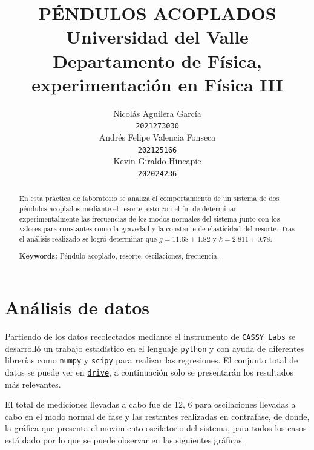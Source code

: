 \documentclass[10pt]{article}
\title{
    PÉNDULOS ACOPLADOS\\
    Universidad del Valle \\
    Departamento de Física, experimentación en Física III
}
\author{
    Nicolás Aguilera García \\
    {\tt 2021273030} \\
    \And
    Andrés Felipe Valencia Fonseca \\
    {\tt 202125166} \\
    \And
    Kevin Giraldo Hincapie\\
    {\tt 202024236} \\
}
\date{}
\begin{document}
    \maketitle

    \begin{abstract}
        En esta práctica de laboratorio se analiza el comportamiento de un sistema de dos péndulos acoplados mediante el resorte, esto con el fin de determinar experimentalmente las frecuencias de los modos normales del sistema junto con los valores para constantes como la gravedad y la constante de elasticidad del resorte. Tras el análisis realizado se logró determinar que $g = 11.68 \pm 1.82$ y $k = 2.811 \pm 0.78$.

            {\bf Keywords: } Péndulo acoplado, resorte, oscilaciones, frecuencia.
    \end{abstract}

    \section{Análisis de datos}
        Partiendo de los datos recolectados mediante el instrumento de \texttt{CASSY Labs} se desarrolló un trabajo estadístico en el lenguaje \texttt{python} y con ayuda de diferentes librerías como \texttt{numpy} y \texttt{scipy} para realizar las regresiones. El conjunto total de datos se puede ver en \href{https://drive.google.com/drive/folders/1HW9HpYB_uKflT2-5fgyOxWJDfALd5ZZW?usp=share_link}{\texttt{drive}}, a continuación solo se presentarán los resultados más relevantes.

        El total de mediciones llevadas a cabo fue de 12, 6 para oscilaciones llevadas a cabo en el modo normal de fase y las restantes realizadas en contrafase, de donde, la gráfica que presenta el movimiento oscilatorio del sistema, para todos los casos está dado por lo que se puede observar en las siguientes gráficas.
\end{document}
